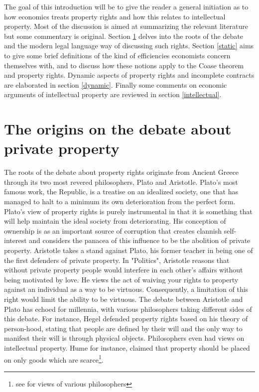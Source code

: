 

The goal of this introduction will be to give the reader a general initiation as to how economics treats property rights and how this relates to intellectual property. Most of the discussion is aimed at summarizing the relevant literature but some commentary is original. Section \ref{origins} delves into the roots of the debate and the modern legal language way of discussing such rights. Section \ref{static} aims to give some brief definitions of the kind of efficiencies economists concern themselves with, and to discuss how these notions apply to the Coase theorem and property rights. Dynamic aspects of property rights and incomplete contracts are elaborated in section \ref{dynamic}. Finally some comments on economic arguments of intellectual property are reviewed in section \ref{intellectual}.

\section{The origins on the debate about private property} \label{origins}

The roots of the debate about property rights originate from Ancient Greece through its two most revered philosophers, Plato and Aristotle. 
Plato's most famous work, the Republic, is a treatise on an idealized society, one that has managed to halt to a minimum its own deterioration from the perfect form. Plato's view of property rights is purely instrumental in that it is something that will help maintain the ideal society from deteriorating. His conception of ownership is as an important source of corruption that creates clannish self-interest and considers the panacea of this influence to be the abolition of private property. Aristotle takes a stand against Plato, his former teacher in being one of the first defenders of private property. In "Politics",  Aristotle reasons that without private property people would interfere in each other’s affairs without being motivated by love. He views the act of waiving your rights to property against an individual as a way to be virtuous. Consequently, a limitation of this right would limit the ability to be virtuous. The debate between Aristotle and Plato has echoed for millennia, with various philosophers taking different sides of this debate. For instance, Hegel defended property rights based on his theory of person-hood, stating that people are defined by their will and the only way to manifest their will is through physical objects. Philosophers even had views on intellectual property. Hume for instance, claimed that property should be placed on only goods which are scarce\footnote{see \cite{plant1934economic} for views of various philosophers}.

